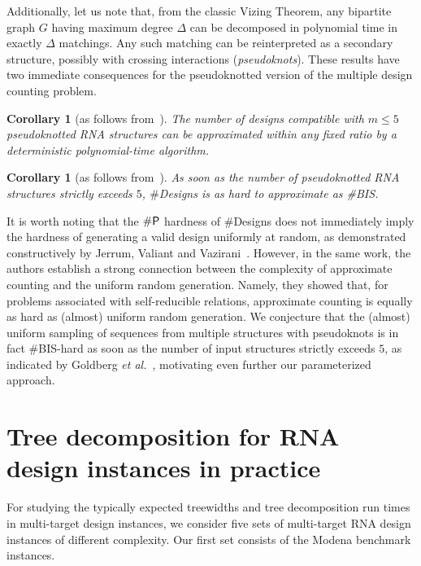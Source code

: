 \documentclass{bioinfo}
\newtheorem{corollary}[theorem]{Corollary}
\newcommand{\Def}[1]{{\it #1}}
\newcommand{\NumDesign}{\ensuremath{\#}{\sf Designs}\xspace}
\begin{document}
Additionally, let us note that, from the classic Vizing Theorem, any bipartite graph $G$ having maximum degree $\Delta$ can be decomposed in polynomial time in exactly $\Delta$ matchings. Any such matching can be reinterpreted as a secondary structure, possibly with crossing interactions (\Def{pseudoknots}). These results have two immediate consequences for the pseudoknotted version of the multiple design counting problem.
\begin{corollary}[as follows from~\cite{Weitz2006}]The number of designs compatible with $m\le 5$ pseudoknotted RNA structures can be approximated within any fixed ratio by a deterministic polynomial-time algorithm.
\end{corollary}
\begin{corollary}[as follows from~\cite{Cai2016}]
  As soon as the number of pseudoknotted RNA structures strictly exceeds $5$, \NumDesign is as hard to approximate as {\#{\sf BIS}}.
\end{corollary}

It is worth noting that the $\#{\sf P}$ hardness of \NumDesign does not immediately imply the hardness of generating a valid design uniformly at random, as demonstrated constructively by Jerrum, Valiant and Vazirani~\cite{Jerrum1986}. However, in the same work, the authors establish a strong connection between the complexity of approximate counting and the uniform random generation. Namely, they showed that, for problems associated with self-reducible relations, approximate counting is equally as hard as (almost) uniform random generation. We conjecture that the (almost) uniform sampling of sequences from multiple structures with pseudoknots is in fact \#{\sf BIS}-hard as soon as the number of input structures strictly exceeds $5$, as indicated by Goldberg \emph{et al.}~\cite{Goldberg2004}, motivating even further our parameterized approach.

\section{Tree decomposition for RNA design instances in practice}
\label{appsec:treedecomp}

For studying the typically expected treewidths and tree decomposition
run times in multi-target design instances, we consider five sets of
multi-target RNA design instances of different complexity. Our first
set consists of the Modena benchmark instances.
\end{document}
